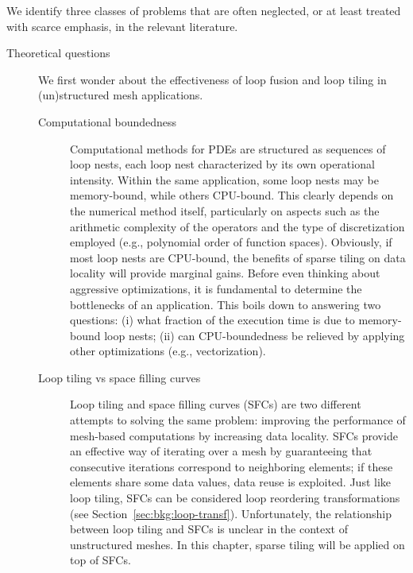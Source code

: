 We identify three classes of problems that are often neglected, or at least treated with scarce emphasis, in the relevant literature. 

\begin{description}
\item[Theoretical questions] We first wonder about the effectiveness of loop fusion and loop tiling in (un)structured mesh applications.

\begin{description}
\item[Computational boundedness] Computational methods for PDEs are structured as sequences of loop nests, each loop nest characterized by its own operational intensity. Within the same application, some loop nests may be memory-bound, while others CPU-bound. This clearly depends on the numerical method itself, particularly on aspects such as the arithmetic complexity of the operators and the type of discretization employed (e.g., polynomial order of function spaces). Obviously, if most loop nests are CPU-bound, the benefits of sparse tiling on data locality will provide marginal gains. Before even thinking about aggressive optimizations, it is fundamental to determine the bottlenecks of an application. This boils down to answering two questions: (i) what fraction of the execution time is due to memory-bound loop nests; (ii) can CPU-boundedness be relieved by applying other optimizations (e.g., vectorization).
\item[Loop tiling vs space filling curves] Loop tiling and space filling curves (SFCs) are two different attempts to solving the same problem: improving the performance of mesh-based computations by increasing data locality. SFCs provide an effective way of iterating over a mesh by guaranteeing that consecutive iterations correspond to neighboring elements; if these elements share some data values, data reuse is exploited. Just like loop tiling, SFCs can be considered loop reordering transformations (see Section~\ref{sec:bkg:loop-transf}). Unfortunately, the relationship between loop tiling and SFCs is unclear in the context of unstructured meshes. In this chapter, sparse tiling will be applied on top of SFCs.
\end{description}


\end{description}
